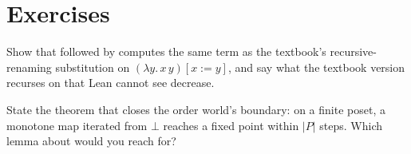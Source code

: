 \section{Exercises}

\begin{exercisebox}
  Show that  followed by  computes the same term as the textbook's
  recursive-renaming substitution on $(\lambda y.\, x\, y)[x := y]$, and say what the textbook
  version recurses on that Lean cannot see decrease.
\end{exercisebox}

\begin{exercisebox}
  State the theorem that closes the order world's boundary: on a finite poset, a monotone map
  iterated from $\bot$ reaches a fixed point within $|P|$ steps. Which lemma about
   would you reach for?
\end{exercisebox}

